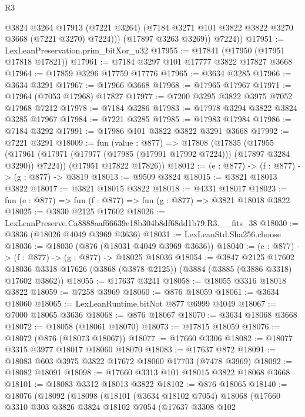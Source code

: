 \begin{lexlean}{R3}
\begin{coremodule}
              @3824
              @3264
              @17913
              (@7221 @3264)
              (@7184 @3271 @101 @3822 @3822 @3270 @3668 (@7221 @3270) @7224)))
          (@17897 @3263 @3269))
        @7224))
@17951 := LexLeanPreservation.prim_bitXor_u32
@17955 := @17841 (@17950 (@17951 @17818 @17821))
@17961 := @7184 @3297 @101 @17777 @3822 @17827 @3668
@17964 := @17859 @3296 @17759 @17776
@17965 := @3634 @3285
@17966 := @3634 @3291
@17967 := @17966 @3668
@17968 := @17965 @17967
@17971 := @17964 (@7053 @17968) @17827
@17977 := @7200 @3295 @3822 @3975 @7052 @17968 @7212
@17978 := @7184 @3286
@17983 := @17978 @3294 @3822 @3824 @3285 @17967
@17984 := @7221 @3285
@17985 := @17983 @17984
@17986 := @7184 @3292
@17991 := @17986 @101 @3822 @3822 @3291 @3668
@17992 := @7221 @3291
@18009 := fun (value : @877) =>
  @17808
    (@17835
      (@17955 (@17961 (@17971 (@17977 (@17985 (@17991 @17992 @7224))) (@17897 @3284 @3290)) @7224))
      (@17951 @17822 @17826))
@18012 := (e : @877) -> (f : @877) -> (g : @877) -> @3819
@18013 := @9509 @3824
@18015 := @3821 @18013 @3822
@18017 := @3821 @18015 @3822
@18018 := @4331 @18017
@18023 := fun (e : @877) => fun (f : @877) => fun (g : @877) => @3821 @18018 @3822
@18025 := @3830 @2125 @17602
@18026 := LexLeanPreserve.Ca8888aaf66639e18b304b8df68dd1b79.R3.__fits_38
@18030 := @3836 (@18026 @4049 @3969 @3636)
@18031 := LexLeanStd.Sha256.choose
@18036 := @18030 (@876 (@18031 @4049 @3969 @3636))
@18040 := (e : @877) -> (f : @877) -> (g : @877) -> @18025 @18036
@18054 := @3847
    @2125
    @17602
    @18036
    @3318
    @17626
    (@3868 (@3878 @2125))
    (@3884 (@3885 (@3886 @3318) @17602 @3862))
@18055 := @17637 @3241
@18058 := @18055 @3316 @18018 @3822
@18059 := @7258 @3969
@18060 := @876 @18059
@18061 := @3634 @18060
@18065 := LexLeanRuntime.bitNot @877 @6999 @4049
@18067 := @7000 @18065 @3636
@18068 := @876 @18067
@18070 := @3634 @18068 @3668
@18072 := @18058 (@18061 @18070)
@18073 := @17815 @18059
@18076 := @18072 (@876 (@18073 @18067))
@18077 := @17660 @3306
@18082 := @18077 @3315 @3977 @18017 @18060 @18070
@18083 := @17637 @872
@18091 := @18083 @603 @3975 @3822 @17672 @18060 @17703 (@7478 @3969)
@18092 := @18082 @18091
@18098 := @17660 @3313 @101 @18015 @3822 @18068 @3668
@18101 := @18083 @3312 @18013 @3822
@18102 := @876 @18065
@18140 := @18076
    (@18092
      (@18098
        (@18101
          (@3634 @18102 @7054)
          @18068
          (@17660
            @3310
            @303
            @3826
            @3824
            @18102
            @7054
            (@17637
              @3308
              @102

\end{coremodule}
\end{lexlean}
